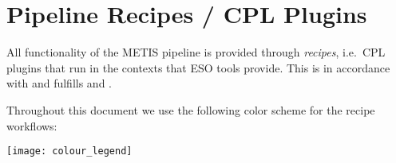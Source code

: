 \clearpage

\section{Pipeline Recipes / CPL Plugins}
\label{sec:pipeline_recipes}

All functionality of the METIS pipeline is provided through \emph{recipes}, i.e.~CPL plugins that run in the contexts that ESO tools provide. This is in accordance with \cite{1618} and fulfills  and .

Throughout this document we use the following color scheme for the
recipe workflows:
\begin{center}
  \texttt{[image: colour\_legend]}
\end{center}










